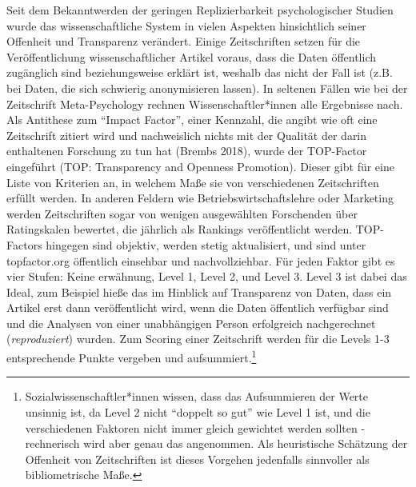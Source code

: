 \documentclass[
  letterpaper,
  DIV=11,
  numbers=noendperiod]{scrreprt}
\begin{document}
Seit dem Bekanntwerden der geringen Replizierbarkeit psychologischer
Studien wurde das wissenschaftliche System in vielen Aspekten
hinsichtlich seiner Offenheit und Transparenz verändert. Einige
Zeitschriften setzen für die Veröffentlichung wissenschaftlicher Artikel
voraus, dass die Daten öffentlich zugänglich sind beziehungsweise
erklärt ist, weshalb das nicht der Fall ist (z.B. bei Daten, die sich
schwierig anonymisieren lassen). In seltenen Fällen wie bei der
Zeitschrift Meta-Psychology rechnen Wissenschaftler*innen alle
Ergebnisse nach. Als Antithese zum ``Impact Factor'', einer Kennzahl,
die angibt wie oft eine Zeitschrift zitiert wird und nachweislich nichts
mit der Qualität der darin enthaltenen Forschung zu tun hat (Brembs
2018), wurde der TOP-Factor eingeführt (TOP: Transparency and Openness
Promotion). Dieser gibt für eine Liste von Kriterien an, in welchem Maße
sie von verschiedenen Zeitschriften erfüllt werden. In anderen Feldern
wie Betriebswirtschaftslehre oder Marketing werden Zeitschriften sogar
von wenigen ausgewählten Forschenden über Ratingskalen bewertet, die
jährlich als Rankings veröffentlicht werden. TOP-Factors hingegen sind
objektiv, werden stetig aktualisiert, und sind unter topfactor.org
öffentlich einsehbar und nachvollziehbar. Für jeden Faktor gibt es vier
Stufen: Keine erwähnung, Level 1, Level 2, und Level 3. Level 3 ist
dabei das Ideal, zum Beispiel hieße das im Hinblick auf Transparenz von
Daten, dass ein Artikel erst dann veröffentlicht wird, wenn die Daten
öffentlich verfügbar sind und die Analysen von einer unabhängigen Person
erfolgreich nachgerechnet (\emph{reproduziert}) wurden. Zum Scoring
einer Zeitschrift werden für die Levels 1-3 entsprechende Punkte
vergeben und aufsummiert.\footnote{Sozialwissenschaftler*innen wissen,
  dass das Aufsummieren der Werte unsinnig ist, da Level 2 nicht
  ``doppelt so gut'' wie Level 1 ist, und die verschiedenen Faktoren
  nicht immer gleich gewichtet werden sollten - rechnerisch wird aber
  genau das angenommen. Als heuristische Schätzung der Offenheit von
  Zeitschriften ist dieses Vorgehen jedenfalls sinnvoller als
  bibliometrische Maße.}
\end{document}
